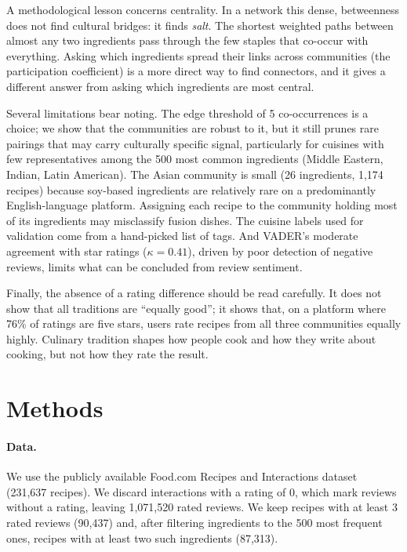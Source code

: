 \documentclass[9pt,twocolumn]{pnas-new}
\begin{document}
A methodological lesson concerns centrality. In a network this dense, betweenness does not find cultural bridges: it finds \textit{salt}. The shortest weighted paths between almost any two ingredients pass through the few staples that co-occur with everything. Asking which ingredients spread their links across communities (the participation coefficient) is a more direct way to find connectors, and it gives a different answer from asking which ingredients are most central.

Several limitations bear noting. The edge threshold of 5 co-occurrences is a choice; we show that the communities are robust to it, but it still prunes rare pairings that may carry culturally specific signal, particularly for cuisines with few representatives among the 500 most common ingredients (Middle Eastern, Indian, Latin American). The Asian community is small (26 ingredients, 1,174 recipes) because soy-based ingredients are relatively rare on a predominantly English-language platform. Assigning each recipe to the community holding most of its ingredients may misclassify fusion dishes. The cuisine labels used for validation come from a hand-picked list of tags. And VADER's moderate agreement with star ratings ($\kappa = 0.41$), driven by poor detection of negative reviews, limits what can be concluded from review sentiment.

Finally, the absence of a rating difference should be read carefully. It does not show that all traditions are ``equally good''; it shows that, on a platform where 76\% of ratings are five stars, users rate recipes from all three communities equally highly. Culinary tradition shapes how people cook and how they write about cooking, but not how they rate the result.

\section*{Methods}

\paragraph{Data.}
We use the publicly available Food.com Recipes and Interactions dataset~\cite{majumder2019generating} (231,637 recipes). We discard interactions with a rating of 0, which mark reviews without a rating, leaving 1,071,520 rated reviews. We keep recipes with at least 3 rated reviews (90,437) and, after filtering ingredients to the 500 most frequent ones, recipes with at least two such ingredients (87,313).
\end{document}
